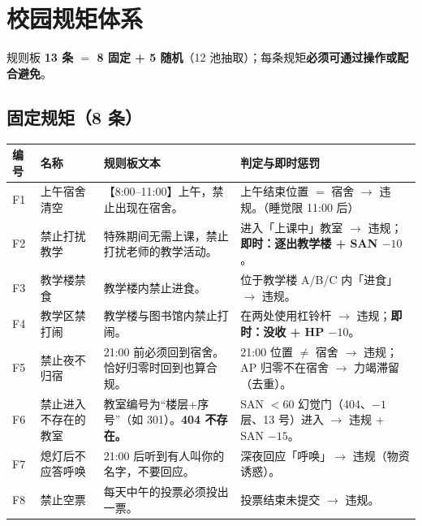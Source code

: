 \documentclass[UTF8, fontset=none, 11pt]{ctexart}
\begin{document}
\section{校园规矩体系}
规则板 \textbf{13 条 $=$ 8 固定 + 5 随机}（12 池抽取）；每条规矩\textbf{必须可通过操作或配合避免}。

\subsection{固定规矩（8 条）}
\begin{longtable}{p{0.7cm}p{2.6cm}p{5.8cm}p{5.9cm}}
\toprule
编号 & 名称 & 规则板文本 & 判定与即时惩罚 \\
\midrule
\endhead
F1 & 上午宿舍清空 & 【8:00--11:00】上午，禁止出现在宿舍。 & 上午结束位置 $=$ 宿舍 $\to$ 违规。（睡觉限 11:00 后） \\
F2 & 禁止打扰教学 & 特殊期间无需上课，禁止打扰老师的教学活动。 & 进入「上课中」教室 $\to$ 违规；\textbf{即时：逐出教学楼 + SAN $-10$}。 \\
F3 & 教学楼禁食 & 教学楼内禁止进食。 & 位于教学楼 A/B/C 内「进食」$\to$ 违规。 \\
F4 & 教学区禁打闹 & 教学楼与图书馆内禁止打闹。 & 在两处使用杠铃杆 $\to$ 违规；\textbf{即时：没收 + HP $-10$}。 \\
F5 & 禁止夜不归宿 & 21:00 前必须回到宿舍。恰好归零时回到也算合规。 & 21:00 位置 $\ne$ 宿舍 $\to$ 违规；AP 归零不在宿舍 $\to$ 力竭滞留（去重）。 \\
F6 & 禁止进入不存在的教室 & 教室编号为``楼层+序号''（如 301）。\textbf{404 不存在。} & SAN $<60$ 幻觉门（404、$-1$ 层、13 号）进入 $\to$ 违规 + SAN $-15$。 \\
F7 & 熄灯后不应答呼唤 & 21:00 后听到有人叫你的名字，不要回应。 & 深夜回应「呼唤」$\to$ 违规（物资诱惑）。 \\
F8 & 禁止空票 & 每天中午的投票必须投出一票。 & 投票结束未提交 $\to$ 违规。 \\
\bottomrule
\end{longtable}
\end{document}
